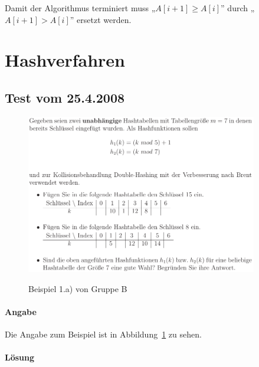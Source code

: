 \documentclass[a4paper, 12pt]{article}
\begin{document}
Damit der Algorithmus terminiert muss „$A[i+1]≥ A[i]$” durch „$A[i+1] > A[i]$” ersetzt werden.

\section{Hashverfahren}

\subsection{Test vom 25.4.2008}

\begin{figure}[htbp]
	\caption{Beispiel 1.a) von Gruppe B}
	\vskip 0.2cm
	\centering
	\includegraphics[width=0.9\textwidth]{Figures/Test_2010-01-14_1Ba}
	\label{figure:Test_2010-01-14_1Ba}
\end{figure}

\paragraph{Angabe}

Die Angabe zum Beispiel ist in Abbildung~\ref{figure:Test_2010-01-14_1Ba} zu sehen.

\paragraph{Lösung}
\end{document}
